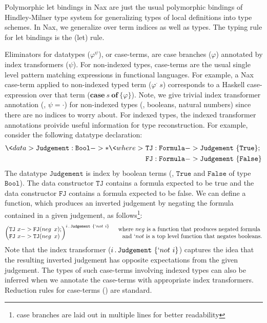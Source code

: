 Polymorphic let bindings in Nax are just the usual polymorphic bindings of
Hindley-Milner type system for generalizing types of local definitions into
type schemes. In Nax, we generalize over term indices as well as types.
The typing rule for let bindings is the (let) rule.

Eliminators for datatypes ($\varphi^\psi$), or case-terms, are
case branches ($\varphi$) annotated by index transformers ($\psi$).
For non-indexed types, case-terms are the usual single level pattern matching
expressions in functional languages. For example, a Nax case-term applied to
non-indexed typed term ($\varphi^\cdot~s$) corresponds to a Haskell
case-expression over that term ($\mathbf{case}~s~\mathbf{of}~\{\varphi\}$).
Note, we give trivial index transformer annotation (\ie, $\psi=\cdot$) for
non-indexed types (\eg, booleans, natural numbers) since there are no indices
to worry about. For indexed types, the indexed transformer annotations
proivide useful information for type reconstruction. For example, consider
the following datatype declaration:
\begin{align*}
\<data> \mathtt{Judgement : Bool -> *} \<where>
&~\mathtt{TJ : Formula -> Judgement~\{True\}};\\
&~\mathtt{FJ : Formula -> Judgement~\{False\}}
\end{align*}
The datatype $\mathtt{Judgement}$ is index by boolean terms
(\eg, $\mathtt{True}$ and $\mathtt{False}$ of type $\mathtt{Bool}$).
The data constructor $\mathtt{TJ}$ contains a formula expected to be true and
the data constructor $\mathtt{FJ}$ contains a formula expected to be false.
We can define a function, which produces an inverted judgement by negating
the formula contained in a given judgement, as follows\footnote{case branches
are laid out in multiple lines for better readability}:
\[
\begin{pmatrix}
 \mathtt{TJ}~x -> \mathtt{FJ} (\mathop{neg}~x);\\
 \mathtt{FJ}~x -> \mathtt{TJ} (\mathop{neg}~x)\phantom{;}
\end{pmatrix}^{i\,.\,\mathtt{Judgement}~\{`not~i\}}
~~~
\begin{matrix}
 \text{where $neg$ is a function that produces negated formula}\\
~~~\text{and $`not$ is a top level function that negates booleans.}
\end{matrix}
\]
Note that the index transformer ($i\,.\,\mathtt{Judgement}~\{`not~i\}$)
captures the idea that the resulting inverted judgement has opposite
expectations from the given judgement. The types of such case-terms
involving indexed types can also be inferred when we annotate
the case-terms with appropriate index transformers.
Reduction rules for case-terms () are standard.

